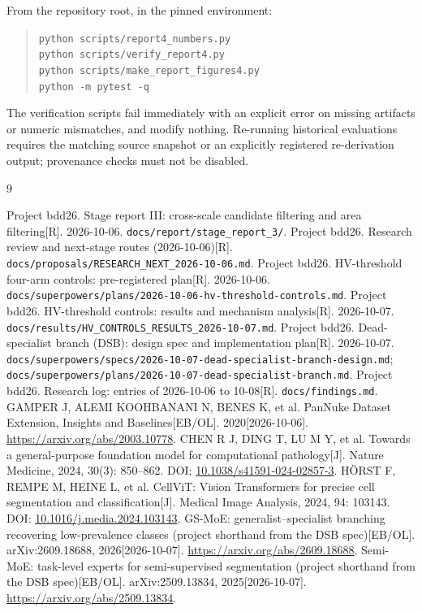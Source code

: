 \documentclass[11pt,a4paper]{article}
\newcommand{\code}[1]{\nolinkurl{#1}}
\begin{document}
From the repository root, in the pinned environment:
\begin{quote}\small
\texttt{python scripts/report4\_numbers.py}\\
\texttt{python scripts/verify\_report4.py}\\
\texttt{python scripts/make\_report\_figures4.py}\\
\texttt{python -m pytest -q}
\end{quote}
The verification scripts fail immediately with an explicit error on missing artifacts or numeric mismatches, and modify nothing. Re-running historical evaluations requires the matching source snapshot or an explicitly registered re-derivation output; provenance checks must not be disabled.

\begin{thebibliography}{9}
\raggedright
{} Project bdd26. Stage report III: cross-scale candidate filtering and area filtering[R]. 2026-10-06. \code{docs/report/stage_report_3/}.
 Project bdd26. Research review and next-stage routes (2026-10-06)[R]. \code{docs/proposals/RESEARCH_NEXT_2026-10-06.md}.
 Project bdd26. HV-threshold four-arm controls: pre-registered plan[R]. 2026-10-06. \code{docs/superpowers/plans/2026-10-06-hv-threshold-controls.md}.
 Project bdd26. HV-threshold controls: results and mechanism analysis[R]. 2026-10-07. \code{docs/results/HV_CONTROLS_RESULTS_2026-10-07.md}.
 Project bdd26. Dead-specialist branch (DSB): design spec and implementation plan[R]. 2026-10-07. \code{docs/superpowers/specs/2026-10-07-dead-specialist-branch-design.md}; \code{docs/superpowers/plans/2026-10-07-dead-specialist-branch.md}.
 Project bdd26. Research log: entries of 2026-10-06 to 10-08[R]. \code{docs/findings.md}.
 GAMPER J, ALEMI KOOHBANANI N, BENES K, et al. PanNuke Dataset Extension, Insights and Baselines[EB/OL]. 2020[2026-10-06]. \url{https://arxiv.org/abs/2003.10778}.
 CHEN R J, DING T, LU M Y, et al. Towards a general-purpose foundation model for computational pathology[J]. Nature Medicine, 2024, 30(3): 850--862. DOI: \href{https://doi.org/10.1038/s41591-024-02857-3}{10.1038/s41591-024-02857-3}.
 H\"ORST F, REMPE M, HEINE L, et al. CellViT: Vision Transformers for precise cell segmentation and classification[J]. Medical Image Analysis, 2024, 94: 103143. DOI: \href{https://doi.org/10.1016/j.media.2024.103143}{10.1016/j.media.2024.103143}.
 GS-MoE: generalist--specialist branching recovering low-prevalence classes (project shorthand from the DSB spec)[EB/OL]. arXiv:2609.18688, 2026[2026-10-07]. \url{https://arxiv.org/abs/2609.18688}.
 Semi-MoE: task-level experts for semi-supervised segmentation (project shorthand from the DSB spec)[EB/OL]. arXiv:2509.13834, 2025[2026-10-07]. \url{https://arxiv.org/abs/2509.13834}.
\end{thebibliography}
\end{document}
